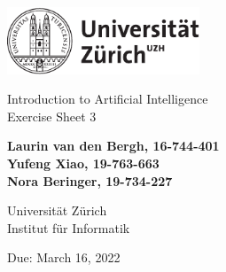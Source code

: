 \documentclass[12pt]{article}
\begin{document}
\begin{titlepage}
\includegraphics[height=20mm]{images/uzh_logo}\\

\begin{flushleft}

\vspace{2cm}

{\Large Introduction to Artificial Intelligence\\Exercise Sheet 3}\\

\vspace{4cm}

\textbf{Laurin van den Bergh, 16-744-401\\Yufeng Xiao, 19-763-663\\Nora Beringer, 19-734-227}\\

\vspace{2cm}

Universität Zürich\\
Institut für Informatik

\vfill Due: March 16, 2022

\vspace{3cm}


\end{flushleft}
\end{titlepage}

\newpage
\end{document}

